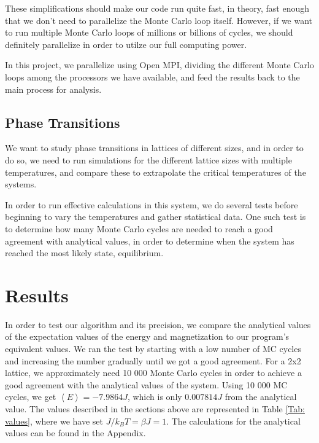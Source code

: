 \documentclass{article}
\begin{document}
		These simplifications should make our code run quite fast, in theory, fast enough that we don't need to parallelize the Monte Carlo loop itself. However, if we want to run multiple Monte Carlo loops of millions or billions of cycles, we should definitely parallelize in order to utilze our full computing power.

		In this project, we parallelize using Open MPI, dividing the different Monte Carlo loops among the processors we have available, and feed the results back to the main process for analysis.

	\subsection*{Phase Transitions}
		We want to study phase transitions in lattices of different sizes, and in order to do so, we need to run simulations for the different lattice sizes with multiple temperatures, and compare these to extrapolate the critical temperatures of the systems.

		In order to run effective calculations in this system, we do several tests before beginning to vary the temperatures and gather statistical data. One such test is to determine how many Monte Carlo cycles are needed to reach a good agreement with analytical values, in order to determine when the system has reached the most likely state, equilibrium.

\section{Results}
	In order to test our algorithm and its precision, we compare the analytical values of the expectation values of the energy and magnetization to our program's equivalent values. We ran the test by starting with a low number of MC cycles and increasing the number gradually until we got a good agreement.
	For a 2x2 lattice, we approximately need 10 000 Monte Carlo cycles in order to achieve a good agreement with the analytical values of the system. Using 10 000 MC cycles, we get $\left<E\right> = -7.9864 J$, which is only $0.007814 J$ from the analytical value. The values described in the sections above are represented in Table \ref{Tab: values}, where we have set $J/k_BT =\beta J = 1$. The calculations for the analytical values can be found in the Appendix.
\end{document}
